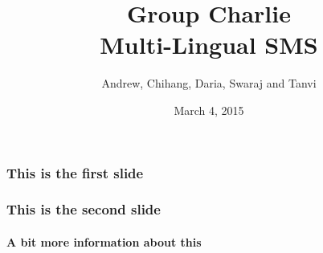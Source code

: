 \documentclass{beamer}
\title{Group Charlie\\Multi-Lingual SMS}
\author{Andrew, Chihang, Daria, Swaraj and Tanvi}
\institute{University of Cambridge}
\date{March 4, 2015}
\begin{document}
\maketitle

\begin{frame}
\frametitle{This is the first slide}
\end{frame}

\begin{frame}
\frametitle{This is the second slide}
\framesubtitle{A bit more information about this}
\end{frame}
\end{document}
